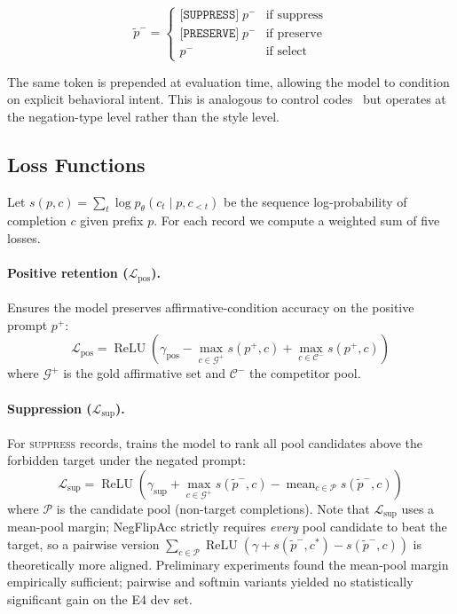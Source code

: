 \documentclass[letterpaper]{article}
\begin{document}
\begin{equation}
\tilde{p}^- = \begin{cases}
  \texttt{[SUPPRESS]}\;p^- & \text{if suppress} \\
  \texttt{[PRESERVE]}\;p^- & \text{if preserve} \\
  p^- & \text{if select}
\end{cases}
\end{equation}

The same token is prepended at evaluation time, allowing the model to
condition on explicit behavioral intent.
This is analogous to control codes~\cite{ouyang2022training} but operates
at the negation-type level rather than the style level.

\subsection{Loss Functions}

Let $s(p, c) = \sum_t \log p_\theta(c_t \mid p, c_{<t})$ be the
sequence log-probability of completion $c$ given prefix $p$.
For each record we compute a weighted sum of five losses.

\paragraph{Positive retention ($\mathcal{L}_\text{pos}$).}
Ensures the model preserves affirmative-condition accuracy on the
positive prompt $p^+$:
\begin{equation}
\mathcal{L}_\text{pos} = \operatorname{ReLU}\!\left(
  \gamma_\text{pos} - \max_{c \in \mathcal{G}^+} s(p^+, c)
  + \max_{c \in \mathcal{C}^-} s(p^+, c)
\right)
\end{equation}
where $\mathcal{G}^+$ is the gold affirmative set and
$\mathcal{C}^-$ the competitor pool.

\paragraph{Suppression ($\mathcal{L}_\text{sup}$).}
For \textsc{suppress} records, trains the model to rank all pool
candidates above the forbidden target under the negated prompt:
\begin{equation}
\mathcal{L}_\text{sup} = \operatorname{ReLU}\!\left(
  \gamma_\text{sup} + \max_{c \in \mathcal{G}^+} s(\tilde{p}^-, c)
  - \operatorname{mean}_{c \in \mathcal{P}} s(\tilde{p}^-, c)
\right)
\end{equation}
where $\mathcal{P}$ is the candidate pool (non-target completions).
Note that $\mathcal{L}_\text{sup}$ uses a mean-pool margin; NegFlipAcc strictly
requires \emph{every} pool candidate to beat the target, so a pairwise version
$\sum_{c \in \mathcal{P}} \operatorname{ReLU}(\gamma + s(\tilde{p}^-, c^*) - s(\tilde{p}^-, c))$
is theoretically more aligned.
Preliminary experiments found the mean-pool margin empirically sufficient;
pairwise and softmin variants yielded no statistically significant gain on
the E4 dev set.
\end{document}
